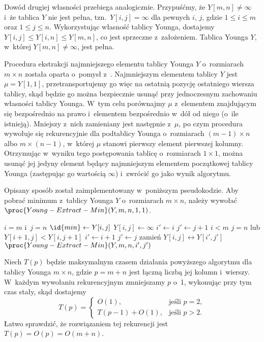 Dowód drugiej własności przebiega analogicznie. Przypuśćmy, że $Y[m,n]\ne\infty$ i~że tablica $Y$ nie jest pełna, tzn.\ $Y[i,j]=\infty$ dla pewnych $i$, $j$, gdzie $1\le i\le m$ oraz $1\le j\le n$. Wykorzystując własność tablicy Younga, dostajemy $Y[i,j]\le Y[i,n]\le Y[m,n]$, co jest sprzeczne z~założeniem. Tablica Younga $Y$, w~której $Y[m,n]\ne\infty$, jest pełna.

\subproblem %
Procedura ekstrakcji najmniejszego elementu tablicy Younga $Y$ o~rozmiarach $m\times n$ została oparta o~pomysł z~. Najmniejszym elementem tablicy $Y$ jest $\mu=Y[1,1]$, przetransportujemy go więc na ostatnią pozycję ostatniego wiersza tablicy, skąd będzie go można bezpiecznie usunąć przy jednoczesnym zachowaniu własności tablicy Younga. W~tym celu porównajmy $\mu$ z~elementem znajdującym się bezpośrednio na prawo i~elementem bezpośrednio w~dół od niego (o~ile istnieją). Mniejszy z~nich zamieniany jest następnie z~$\mu$, po czym procedura wywołuje się rekurencyjnie dla podtablicy Younga o~rozmiarach $(m-1)\times n$ albo $m\times(n-1)$, w~której $\mu$ stanowi pierwszy element pierwszej kolumny. Otrzymując w~wyniku tego postępowania tablicę o~rozmiarach $1\times1$, można usunąć jej jedyny element będący najmniejszym elementem początkowej tablicy Younga (zastępując go wartością $\infty$) i~zwrócić go jako wynik algorytmu.

Opisany sposób został zaimplementowany w~poniższym pseudokodzie. Aby pobrać minimum z~tablicy Younga $Y$ o~rozmiarach $m\times n$, należy wywołać $\proc{Young-Extract-Min}(Y,m,n,1,1)$.
\begin{codebox}
\li	\If $i=m$ i~$j=n$
\li		\Then
			$\id{min}\gets Y[i,j]$
\li			$Y[i,j]\gets\infty$
\li			\Return {}
		\End
\li	$i'\gets i$
\li	$j'\gets j+1$
\li	\If $i<m$
\li		\Then
			\If $j=n$ lub $Y[i+1,j]<Y[i,j+1]$
\li				\Then
					$i'\gets i+1$
\li					$j'\gets j$
				\End
		\End
\li	zamień $Y[i,j]\leftrightarrow Y[i',j']$
\li	\Return $\proc{Young-Extract-Min}(Y,m,n,i',j')$
\end{codebox}

Niech $T(p)$ będzie maksymalnym czasem działania powyższego algorytmu dla tablicy Younga $m\times n$, gdzie $p=m+n$ jest łączną liczbą jej kolumn i~wierszy. W~każdym wywołaniu rekurencyjnym zmniejszamy $p$ o~1, wykonując przy tym czas stały, skąd dostajemy
\[
	T(p) =
	\begin{cases}
		O(1), & \text{jeśli $p=2$}, \\
		T(p-1) + O(1), & \text{jeśli $p>2$}.
	\end{cases}
\]
Łatwo sprawdzić, że rozwiązaniem tej rekurencji jest $T(p)=O(p)=O(m+n)$.

